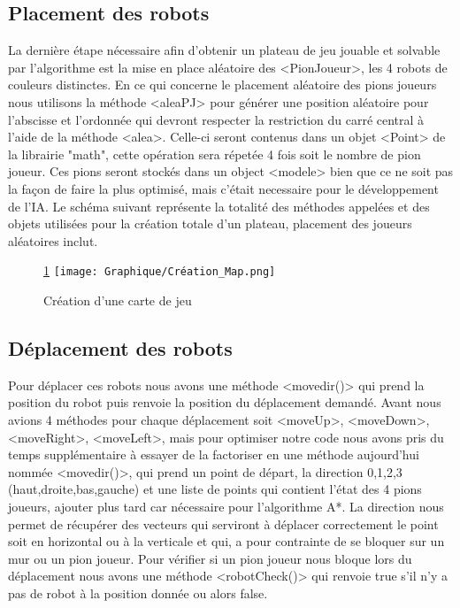 \documentclass{rapportECL}
\begin{document}
\subsection{Placement des robots}
La dernière étape nécessaire afin d'obtenir un plateau de jeu jouable et solvable par l'algorithme est la mise en place aléatoire des <PionJoueur>, les 4 robots de couleurs distinctes.
\newline
En ce qui concerne le placement aléatoire des pions joueurs nous utilisons la méthode <aleaPJ> pour générer une position aléatoire pour l'abscisse et l'ordonnée qui devront respecter la restriction du carré central à l'aide de la méthode <alea>. Celle-ci seront contenus dans un objet <Point> de la librairie "math", cette opération sera répetée 4 fois soit le nombre de pion joueur.
\newline
Ces pions seront stockés dans un object <modele> bien que ce ne soit pas la façon de faire la plus optimisé, mais c'était necessaire pour le développement de l'IA.
\newline
\newline
Le schéma suivant représente la totalité des méthodes appelées et des objets utilisées pour la création totale d'un plateau, placement des joueurs aléatoires inclut.
\newpage

\begin{figure}[h]
    \centering
    \ref{Fig4}
    \texttt{[image: Graphique/Création\_Map.png]}
    \caption{Création d'une carte de jeu}
    \label{Fig4}
\end{figure}

\subsection{Déplacement des robots}
Pour déplacer ces robots nous avons une méthode <movedir()> qui prend la position du robot puis renvoie la position du déplacement demandé. Avant nous avions 4 méthodes pour chaque déplacement soit <moveUp>, <moveDown>, <moveRight>, <moveLeft>, mais pour optimiser notre code nous avons pris du temps supplémentaire à essayer de la factoriser en une méthode aujourd'hui nommée <movedir()>, qui prend un point de départ, la direction 0,1,2,3 (haut,droite,bas,gauche) et une liste de points qui contient l'état des 4 pions joueurs, ajouter plus tard car nécessaire pour l'algorithme A*.
\newline
La direction nous permet de récupérer des vecteurs qui serviront à déplacer correctement le point soit en horizontal ou à la verticale et qui, a pour contrainte de se bloquer sur un mur ou un pion joueur. Pour vérifier si un pion joueur nous bloque lors du déplacement nous avons une méthode <robotCheck()> qui renvoie true s'il n'y a pas de robot à la position donnée ou alors false.
\newpage
\end{document}
